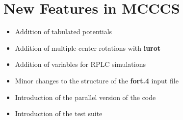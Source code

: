 \documentclass[12pt,letterpaper]{article}
\begin{document}

\section{New Features in MCCCS}
\begin{itemize}
\item Addition of tabulated potentials
\item Addition of multiple-center rotations with {\bf iurot}
\item Addition of variables for RPLC simulations
\item Minor changes to the structure of the {\bf fort.4} input file
\item Introduction of the parallel version of the code
\item Introduction of the test suite
\end{itemize}
\end{document}
